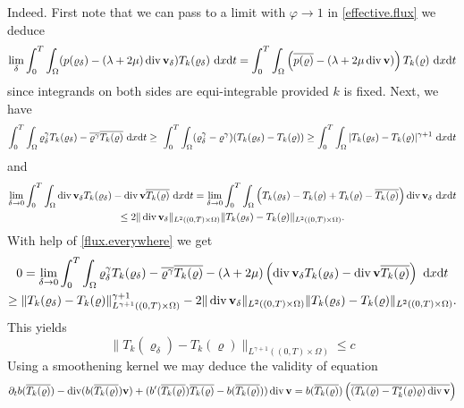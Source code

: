 \documentclass{article}
\DeclareMathOperator{\diver}{div}
\newcommand{\bv}{{\bf v}}
\newcommand{\vv}{\bv}
\newcommand{\pat}{\partial_t}
\numberwithin{equation}{section}
\begin{document}
Indeed. First note that we can pass to a limit with $\varphi\to 1$ in \eqref{effective.flux} we deduce
\begin{equation}\label{flux.everywhere}
\lim_\delta\int_0^T\int_\Omega (p(\varrho_\delta) - (\lambda + 2\mu)\diver \vv_\delta ) T_k(\varrho_\delta)\ {\rm d}x{\rm d}t = \int_0^T\int_\Omega \left( \overline{p(\varrho)} - (\lambda + 2\mu \diver \vv) \right) T_k(\varrho)\ {\rm d}x{\rm d}t
\end{equation}
since integrands on both sides are equi-integrable provided $k$ is fixed. Next, we have
$$
\int_0^T\int_\Omega \varrho_\delta^\gamma T_k(\varrho_\delta) - \overline{\varrho^\gamma} \overline{T_k(\varrho)} \ {\rm d}x{\rm d}t \geq\ \int_0^T\int_\Omega (\varrho_\delta^\gamma - \varrho^\gamma) (T_k(\varrho_\delta) - T_k(\varrho))\geq \int_0^T\int_\Omega |T_k(\varrho_\delta) - T_k(\varrho)|^{\gamma+1}\ {\rm d}x{\rm d}t
$$
and
\begin{multline*}
\lim_{\delta\to 0} \int_0^T\int_\Omega \diver \vv_\delta T_k(\varrho_\delta ) - \diver \vv \overline{T_k(\varrho)}\ {\rm d}x{\rm d}t = \lim_{\delta\to 0}\int_0^T\int_\Omega \left( T_k(\varrho_\delta) - T_k(\varrho) + T_k(\varrho) - \overline{T_k(\varrho)}\right) \diver\vv_\delta \ {\rm d}x{\rm d}t\\
%
\leq 2 \|\diver \vv_\delta\|_{L^2((0,T)\times\Omega)} \|T_k(\varrho_\delta) - T_k(\varrho)\|_{L^2((0,T)\times \Omega)}.
\end{multline*}
With help of \eqref{flux.everywhere} we get
\begin{multline*}
0 = \lim_{\delta\to 0} \int_0^T\int_\Omega \varrho_\delta^\gamma T_k(\varrho_\delta) - \overline{\varrho^\gamma} \overline{T_k(\varrho)} - (\lambda + 2\mu)\left(\diver\vv_\delta T_k(\varrho_\delta) - \diver \vv  \overline{T_k(\varrho)}\right)\ {\rm d}x{\rm d}t\\
%
\geq \|T_k(\varrho_\delta) - T_k(\varrho) \|_{L^{\gamma+1}((0,T)\times\Omega)}^{\gamma+1} - 2\|\diver \vv_\delta\|_{L^2((0,T)\times\Omega)} \|T_k(\varrho_\delta) - T_k(\varrho)\|_{L^2((0,T)\times\Omega)}.
\end{multline*}
This yields
\begin{equation*}
\|T_k(\varrho_\delta) - T_k(\varrho)\|_{L^{\gamma+1}((0,T)\times\Omega)}\leq c
\end{equation*}
 Using a smoothening kernel we may deduce the validity of equation
\begin{equation}\label{pre.renorm}
\pat b(\overline{T_k(\varrho)}) - \diver (b(\overline{T_k(\varrho)})\vv) + (b'(\overline{T_k(\varrho)}) \overline{T_k(\varrho)} - b(\overline{T_k(\varrho)}))\diver \vv = b(\overline{T_k(\varrho)}) \left(\overline{(T_k(\varrho) - T'_k(\varrho)\varrho   )\diver \vv}\right)
\end{equation}
\end{document}
